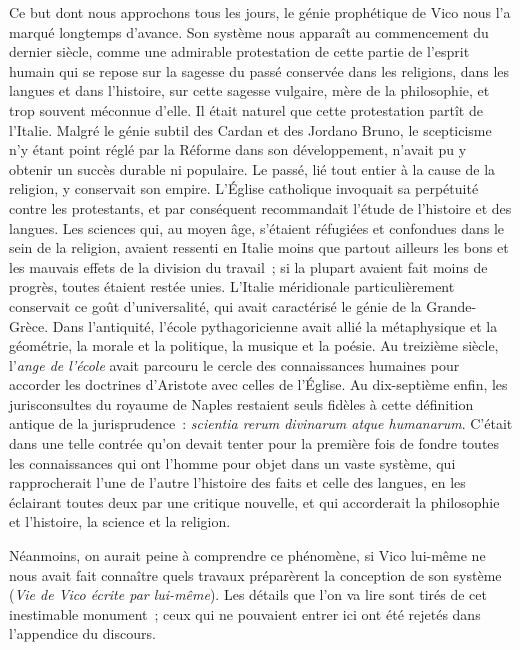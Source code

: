 \documentclass[french,twoside]{book} %
\begin{document}
 Ce but dont nous approchons tous les jours, le génie prophétique de Vico nous l’a marqué longtemps d’avance. Son système nous apparaît au commencement du dernier siècle, comme une admirable protestation de cette partie de l’esprit humain qui se repose sur la sagesse du passé conservée dans les religions, dans les langues et dans l’histoire, sur cette sagesse vulgaire, mère de la philosophie, et trop souvent méconnue d’elle. Il était naturel que cette protestation partît de l’Italie. Malgré le génie subtil des Cardan et des Jordano Bruno, le scepticisme n’y étant point réglé par la Réforme dans son développement, n’avait pu y obtenir un succès durable ni populaire. Le passé, lié tout entier à la cause de la religion, y conservait son empire. L’Église catholique invoquait sa perpétuité contre les protestants, et par conséquent recommandait l’étude de l’histoire et des langues. Les sciences qui, au moyen âge, s’étaient réfugiées et confondues dans le sein de la religion, avaient ressenti en Italie moins que partout ailleurs les bons et les mauvais effets de la division du travail ; si la plupart avaient fait moins de progrès, toutes étaient restée unies. L’Italie méridionale particulièrement conservait ce goût d’universalité, qui avait caractérisé le génie de la Grande-Grèce. Dans l’antiquité, l’école pythagoricienne avait allié la métaphysique  et la géométrie, la morale et la politique, la musique et la poésie. Au treizième siècle, l’{\itshape ange de l’école} avait parcouru le cercle des connaissances humaines pour accorder les doctrines d’Aristote avec celles de l’Église. Au dix-septième enfin, les jurisconsultes du royaume de Naples restaient seuls fidèles à cette définition antique de la jurisprudence : \emph{{\itshape scientia rerum divinarum atque humanarum}}. C’était dans une telle contrée qu’on devait tenter pour la première fois de fondre toutes les connaissances qui ont l’homme pour objet dans un vaste système, qui rapprocherait l’une de l’autre l’histoire des faits et celle des langues, en les éclairant toutes deux par une critique nouvelle, et qui accorderait la philosophie et l’histoire, la science et la religion.\par
\par
Néanmoins, on aurait peine à comprendre ce phénomène, si Vico lui-même ne nous avait fait connaître quels travaux préparèrent la conception de son système ({\itshape Vie de Vico écrite par lui-même}). Les détails que l’on va lire sont tirés de cet inestimable monument ; ceux qui ne pouvaient entrer ici ont été rejetés dans l’appendice du discours.\par
\end{document}
